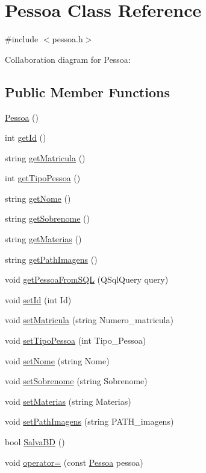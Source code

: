 \hypertarget{classPessoa}{}\section{Pessoa Class Reference}
\label{classPessoa}


{\ttfamily \#include $<$pessoa.\+h$>$}



Collaboration diagram for Pessoa\+:
\subsection*{Public Member Functions}
\begin{DoxyCompactItemize}
\item 
\hyperlink{classPessoa_a22563fe1f53faa9b1d8d10d28ae0c650}{Pessoa} ()
\item 
int \hyperlink{classPessoa_a6699a108d29ebc18cb06c10f3a44c330}{get\+Id} ()
\item 
string \hyperlink{classPessoa_a338f9b529bf8a78edfd5515616353a3c}{get\+Matricula} ()
\item 
int \hyperlink{classPessoa_aec72363ec6bf17739cbda8f13af440a7}{get\+Tipo\+Pessoa} ()
\item 
string \hyperlink{classPessoa_aedeca9c83ea13db9c487ceb48ac37da7}{get\+Nome} ()
\item 
string \hyperlink{classPessoa_acba657deef9c9aecd55eac2cbb61ffd6}{get\+Sobrenome} ()
\item 
string \hyperlink{classPessoa_aa0600391a39d2f27e680952f1a4172ab}{get\+Materias} ()
\item 
string \hyperlink{classPessoa_a5b7bac17898a7e2d81768a980aaae1c0}{get\+Path\+Imagens} ()
\item 
void \hyperlink{classPessoa_a719cbc182279b895fe156fc66cf99d00}{get\+Pessoa\+From\+S\+QL} (Q\+Sql\+Query query)
\item 
void \hyperlink{classPessoa_ace040b980db8e6528e4c14db3e65c359}{set\+Id} (int Id)
\item 
void \hyperlink{classPessoa_a0e2ce6288aac2ff7e1b81b07549e4c9c}{set\+Matricula} (string Numero\+\_\+matricula)
\item 
void \hyperlink{classPessoa_a236f3c30200f576a92938dc4c0f5933f}{set\+Tipo\+Pessoa} (int Tipo\+\_\+\+Pessoa)
\item 
void \hyperlink{classPessoa_a17bb95aa9e46059422fcec28da0fefaa}{set\+Nome} (string Nome)
\item 
void \hyperlink{classPessoa_a3f82e17ab976f36237481dc1c8bfa749}{set\+Sobrenome} (string Sobrenome)
\item 
void \hyperlink{classPessoa_a87b4a73b0ff94d7e92788ea9a0b36f67}{set\+Materias} (string Materias)
\item 
void \hyperlink{classPessoa_aeacd523f2c365994a9ad28cd5d6b4cd0}{set\+Path\+Imagens} (string P\+A\+T\+H\+\_\+imagens)
\item 
bool \hyperlink{classPessoa_a72462ac2c329a84d544437998b2536b9}{Salva\+BD} ()
\item 
void \hyperlink{classPessoa_a61ebd05535b48f5c653e1ba03409e1c0}{operator=} (const \hyperlink{classPessoa}{Pessoa} pessoa)
\end{DoxyCompactItemize}


